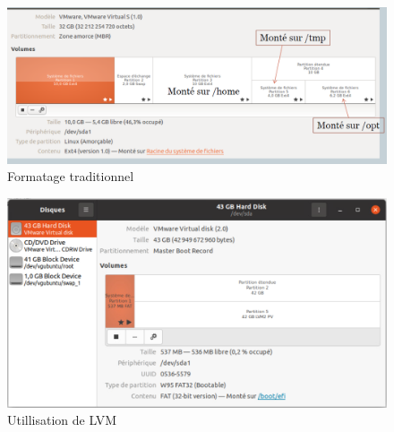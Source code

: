	\begin{frame}[containsverbatim]
	
		\begin{figure}[!h]
			\includegraphics[scale=0.2]{images/capture3}
			\caption{Formatage traditionnel}
		\end{figure}
		\begin{figure}[!htb]
			\includegraphics[scale=0.22]{images/Capture3b}
			\caption{Utillisation de LVM}
			\label{Fig1}
		\end{figure}
	\end{frame}
